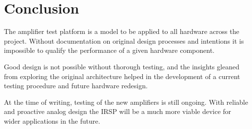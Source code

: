 %
%
\chapter{Conclusion}
The amplifier test platform is a model to be applied to all hardware across the project. Without documentation on original design processes and intentions it is impossible to qualify the performance of a given hardware component. \par
Good design is not possible without thorough testing, and the insights gleaned from exploring the original architecture helped in the development of a current testing procedure and future hardware redesign.\par
At the time of writing, testing of the new amplifiers is still ongoing. With reliable and proactive analog design the IRSP will be a much more viable device for wider applications in the future.